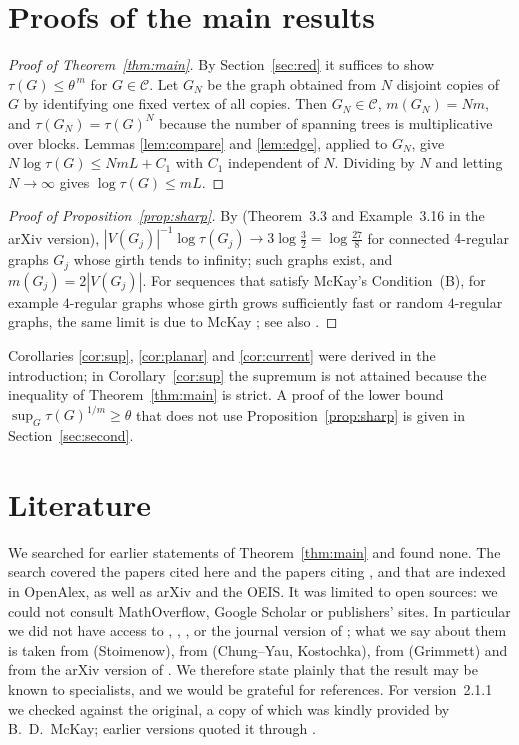 \documentclass[11pt]{amsart}
\theoremstyle{plain}
\theoremstyle{remark}
\newcommand{\cC}{\mathcal{C}}
\newcommand{\tht}{\theta}
\begin{document}
\section{Proofs of the main results}\label{sec:proof}

\begin{proof}[Proof of Theorem~\ref{thm:main}]
By Section~\ref{sec:red} it suffices to show $\tau(G)\le\tht^{\,m}$ for $G\in\cC$. Let $G_N$ be the graph obtained
from $N$ disjoint copies of $G$ by identifying one fixed vertex of all copies. Then $G_N\in\cC$,
$m(G_N)=Nm$, and $\tau(G_N)=\tau(G)^N$ because the number of spanning trees is multiplicative over blocks.
Lemmas \ref{lem:compare} and \ref{lem:edge}, applied to $G_N$, give $N\log\tau(G)\le NmL+C_1$ with $C_1$ independent
of $N$. Dividing by $N$ and letting $N\to\infty$ gives $\log\tau(G)\le mL$.
\end{proof}

\begin{proof}[Proof of Proposition~\ref{prop:sharp}]
By \cite{Lyons} (Theorem~3.3 and Example~3.16 in the arXiv version),
$|V(G_j)|^{-1}\log\tau(G_j)\to3\log\frac32=\log\frac{27}8$
for connected $4$-regular graphs $G_j$ whose girth tends to infinity; such graphs exist, and $m(G_j)=2|V(G_j)|$.
For sequences that satisfy McKay's Condition~(B), for example $4$-regular graphs whose girth grows sufficiently
fast or random $4$-regular graphs, the same limit is due to McKay \cite[Theorems~4.1 and~4.3]{McKay}; see also
\cite{ChungYau}.
\end{proof}

Corollaries \ref{cor:sup}, \ref{cor:planar} and \ref{cor:current} were derived in the introduction; in
Corollary~\ref{cor:sup} the supremum is not attained because the inequality of Theorem~\ref{thm:main} is strict.
A proof of the lower bound $\sup_G\tau(G)^{1/m}\ge\tht$ that does not use Proposition~\ref{prop:sharp} is given in
Section~\ref{sec:second}.

\section{Literature}\label{sec:lit}

We searched for earlier statements of Theorem~\ref{thm:main} and found none. The search covered the papers cited
here and the papers citing \cite{Kenyon}, \cite{Stoimenow} and \cite{CKP} that are indexed in OpenAlex, as well as
arXiv and the OEIS. It was limited to open sources: we could not consult MathOverflow, Google Scholar or
publishers' sites. In particular we did not have access to \cite{Stoimenow}, \cite{ChungYau},
\cite{Grimmett}, \cite{Kostochka} or the journal version of \cite{Kenyon}; what we say about them is taken from
\cite{CKP,GJKLZ} (Stoimenow), from \cite{GIKM,Lyons} (Chung--Yau, Kostochka), from \cite{ShrockWu}
(Grimmett) and from the arXiv version of \cite{Kenyon}. We therefore state plainly that the result may be known to
specialists, and we would be grateful for references. For version~2.1.1 we checked \cite{McKay} against the
original, a copy of which was kindly provided by B.~D.~McKay; earlier versions quoted it through
\cite{GIKM,Lyons}.
\end{document}
